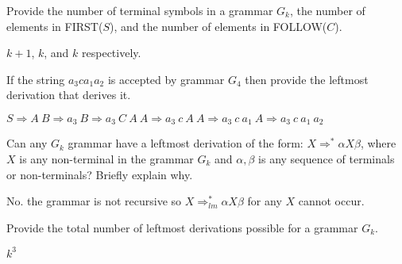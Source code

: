 \documentclass[11pt]{article}
\begin{document}
\begin{exe}
\begin{xlist}
{\ex Provide the number of terminal symbols in a grammar $G_k$, the number of elements in FIRST($S$), and the number of elements in FOLLOW($C$).
\begin{soln}
$k+1$, $k$, and $k$ respectively.
\end{soln}
}

{\ex If the string $a_3 c a_1 a_2$ is accepted by grammar $G_4$ then provide the leftmost derivation that derives it.
\begin{soln}
$S \Rightarrow A\ B \Rightarrow a_3\ B \Rightarrow a_3\ C\ A\ A \Rightarrow a_3\ c\ A\ A \Rightarrow a_3\ c\ a_1\ A \Rightarrow a_3\ c\ a_1\ a_2$
\end{soln}
}

{\ex Can any $G_k$ grammar have a leftmost derivation of the form: $X \Rightarrow^\ast \alpha X \beta$, where $X$ is any non-terminal in the grammar $G_k$ and $\alpha, \beta$ is any sequence of terminals or non-terminals? Briefly explain why.
\begin{soln}
No. the grammar is not recursive so $X \Rightarrow_{lm}^\ast \alpha X \beta$ for any $X$ cannot occur.
\end{soln}
}

{\ex Provide the total number of leftmost derivations possible for a grammar $G_k$.
\begin{soln}
$k^3$
\end{soln}
}

\end{xlist}  

\end{exe}
\end{document}

